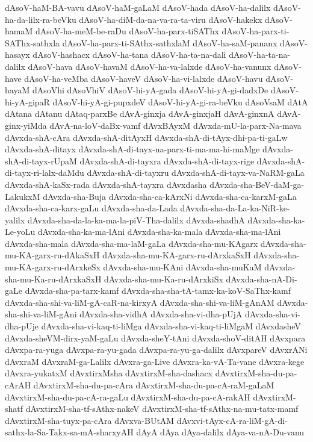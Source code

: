 {dAsoV-haM-BA-vavu
dAsoV-haM-gaLaM
dAsoV-hada
dAsoV-ha-dalilx
dAsoV-ha-da-lilx-ra-beVku
dAsoV-ha-diM-da-na-va-ra-ta-viru
dAsoV-hakekx
dAsoV-hamaM
dAsoV-ha-meM-be-raDu
dAsoV-ha-parx-tiSAThx
dAsoV-ha-parx-ti-SAThx-sathxla
dAsoV-ha-parx-ti-SAthx-sathxlaM
dAsoV-ha-saM-pananx
dAsoV-hasayx
dAsoV-hashacx
dAsoV-ha-tana
dAsoV-ha-ta-na-dali
dAsoV-ha-ta-na-dalilx
dAsoV-hava
dAsoV-havaM
dAsoV-ha-va-lalxde
dAsoV-ha-vanunx
dAsoV-have
dAsoV-ha-veMba
dAsoV-haveV
dAsoV-ha-vi-lalxde
dAsoV-havu
dAsoV-hayaM
dAsoVhi
dAsoVhiV
dAsoV-hi-yA-gada
dAsoV-hi-yA-gi-dadxDe
dAsoV-hi-yA-gipaR
dAsoV-hi-yA-gi-pupxdeV
dAsoV-hi-yA-gi-ra-beVku
dAsoVsaM
dAtA
dAtana
dAtanu
dAtaq-parxBe
dAvA-ginxja
dAvA-ginxjaH
dAvA-ginxnA
dAvA-ginx-yiMda
dAvA-na-loV-daBx-vamf
dAvxBAyxM
dAvxda-mU-la-parx-Na-mava
dAvxda-shA-cAra
dAvxda-shA-ditAyxH
dAvxda-shA-di-tAyx-dhi-pa-ti-gaLw
dAvxda-shA-ditayx
dAvxda-shA-di-tayx-na-parx-ti-ma-ma-hi-maMge
dAvxda-shA-di-tayx-rUpaM
dAvxda-shA-di-tayxra
dAvxda-shA-di-tayx-rige
dAvxda-shA-di-tayx-ri-lalx-daMdu
dAvxda-shA-di-tayxru
dAvxda-shA-di-tayx-va-NaRM-gaLa
dAvxda-shA-kaSx-rada
dAvxda-shA-tayxra
dAvxdasha
dAvxda-sha-BeV-daM-ga-LakukxM
dAvxda-sha-Buja
dAvxda-sha-ca-kArxNi
dAvxda-sha-ca-karxM-gaLa
dAvxda-sha-ca-karx-gaLu
dAvxda-sha-da-Lada
dAvxda-sha-da-La-ka-NiR-ke-yalilx
dAvxda-sha-da-la-ka-ma-la-piV-Tha-dalilx
dAvxda-shadhA
dAvxda-sha-ka-Le-yoLu
dAvxda-sha-ka-ma-lAni
dAvxda-sha-ka-mala
dAvxda-sha-ma-lAni
dAvxda-sha-mala
dAvxda-sha-ma-laM-gaLa
dAvxda-sha-mu-KAgarx
dAvxda-sha-mu-KA-garx-ru-dAkaSxH
dAvxda-sha-mu-KA-garx-ru-dArxkaSxH
dAvxda-sha-mu-KA-garx-ru-dArxkeSx
dAvxda-sha-mu-KAni
dAvxda-sha-muKaM
dAvxda-sha-mu-Ka-ru-dArxkaSxH
dAvxda-sha-mu-Ka-ru-dArxkiSx
dAvxda-sha-nA-Di-gaLe
dAvxda-sha-pa-tarx-kamf
dAvxda-sha-sha-tA-tamx-ka-koV-SaThx-kamf
dAvxda-sha-shi-va-liM-gA-caR-na-kirxyA
dAvxda-sha-shi-va-liM-gAnAM
dAvxda-sha-shi-va-liM-gAni
dAvxda-sha-vidhA
dAvxda-sha-vi-dha-pUjA
dAvxda-sha-vi-dha-pUje
dAvxda-sha-vi-kaq-ti-liMga
dAvxda-sha-vi-kaq-ti-liMgaM
dAvxdasheV
dAvxda-sheVM-dirx-yaM-gaLu
dAvxda-sheY-tAni
dAvxda-shoV-ditAH
dAvxpara
dAvxpa-ra-yuga
dAvxpa-ra-yu-gada
dAvxpa-ra-yu-ga-dalilx
dAvxpareV
dAvxrANi
dAvxraM
dAvxraM-ga-Lalilx
dAvxra-ga-Live
dAvxra-ka-vA-Ta-vane
dAvxra-kege
dAvxra-yukatxM
dAvxtirxMsha
dAvxtirxM-sha-dashacx
dAvxtirxM-sha-du-pa-cArAH
dAvxtirxM-sha-du-pa-cAra
dAvxtirxM-sha-du-pa-cA-raM-gaLaM
dAvxtirxM-sha-du-pa-cA-ra-gaLu
dAvxtirxM-sha-du-pa-cA-rakAH
dAvxtirxM-shatf
dAvxtirxM-sha-tf-sAthx-nakeV
dAvxtirxM-sha-tf-sAthx-na-mu-tatx-mamf
dAvxtirxM-sha-tuyx-pa-cAra
dAvxva-BUtAM
dAvxvi-tAyx-cA-ra-liM-gA-di-sathx-la-Sa-Takx-sa-mA-sharxyAH
dAyA
dAya
dAya-dalilx
dAya-va-nA-Du-vanu
}
